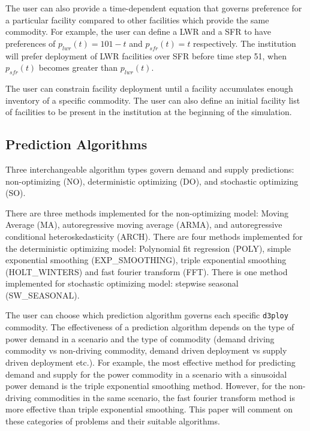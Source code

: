 \documentclass[11pt]{article}
\newcommand{\deploy}{\texttt{d3ploy}\xspace}%
\begin{document}
The user can also provide a time-dependent equation that governs
preference for a particular facility compared to other facilities which 
provide the same commodity. 
For example, the user can define a \gls{LWR} and a \gls{SFR} to have
preferences of $p_{lwr}(t) = 101 - t$ and $p_{sfr}(t) = t$ respectively. 
The institution will prefer deployment of \gls{LWR} facilities over 
\gls{SFR} before time step 51, when $p_{sfr}(t)$ becomes greater than 
$p_{lwr}(t)$. 

The user can constrain facility deployment 
until a facility accumulates enough inventory of a specific commodity.  
The user can also define an initial facility list of facilities to be 
present in the institution at the beginning of the simulation. 

\subsection{\textbf{Prediction Algorithms}}
Three interchangeable algorithm types govern demand and supply 
predictions: non-optimizing (NO), deterministic optimizing (DO), and stochastic
optimizing (SO). 

There are three methods implemented for the non-optimizing model: 
Moving Average (MA), autoregressive moving average (ARMA), and autoregressive 
conditional heteroskedasticity (ARCH).
There are four methods implemented for the deterministic optimizing model: 
Polynomial fit regression (POLY), simple exponential smoothing (EXP\_SMOOTHING),
triple exponential smoothing (HOLT\_WINTERS) and fast fourier 
transform (FFT). 
There is one method implemented for stochastic optimizing model: 
stepwise seasonal (SW\_SEASONAL).  

The user can choose which prediction algorithm governs each specific 
\deploy commodity. 
The effectiveness of a prediction algorithm depends on the type 
of power demand in a scenario and the type of commodity (demand 
driving commodity vs non-driving commodity, demand driven 
deployment vs supply driven deployment etc.). 
For example, the most effective method
for predicting demand and supply for the power commodity in a scenario  
with a sinusoidal power demand is the triple exponential smoothing method. 
However, for the non-driving commodities in the same 
scenario, the fast fourier transform method is more effective than triple 
exponential smoothing. 
This paper will comment on these categories of problems and their suitable
algorithms. 
\end{document}
